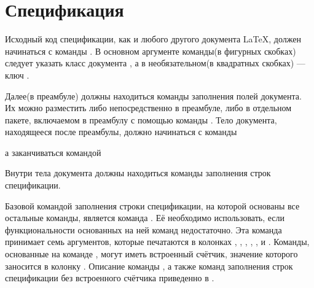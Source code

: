 
\section{Спецификация}

Исходный код спецификации, как и любого другого документа \LaTeX{}, должен
начинаться с команды . В основном аргументе
команды(в фигурных скобках) следует указать класс документа , а в
необязательном(в квадратных скобках) --- ключ .


Далее(в преамбуле) должны находиться команды заполнения полей документа. Их можно
разместить либо непосредственно в преамбуле, либо в отдельном пакете, включаемом в
преамбулу с помощью команды . Тело документа,
находящееся после преамбулы, должно начинаться с команды

\begin{pcbdoccode}

\end{pcbdoccode}

а заканчиваться командой

\begin{pcbdoccode}

\end{pcbdoccode}

Внутри тела документа должны находиться команды заполнения строк спецификации.

Базовой командой заполнения строки спецификации, на которой основаны все ос\-таль\-ные
команды, является команда . Её необходимо использовать,
если функциональности основанных на ней команд недостаточно. Эта команда принимает семь
аргументов, которые печатаются в колонках
, ,
, ,
,  и
. Команды, основанные на
команде , могут иметь встроенный счётчик, значение которого
заносится в колонку . Описание команды
, а также команд заполнения строк спецификации без
встроенного счётчика приведенно в .\sloppy

